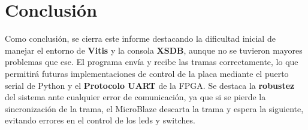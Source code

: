 \documentclass[12pt, a4paper]{article}
\begin{document}
\newpage

\section{Conclusión}
    Como conclusión, se cierra este informe destacando la dificultad inicial de manejar el entorno de \textbf{Vitis} y la consola \textbf{XSDB}, aunque no se tuvieron mayores problemas que ese.
    El programa envía y recibe las tramas correctamente, lo que permitirá futuras implementaciones de control de la placa mediante el puerto serial de Python y el \textbf{Protocolo UART} de la 
    FPGA. Se destaca la \textbf{robustez} del sistema ante cualquier error de comunicación, ya que si se pierde la sincronización de la trama, el MicroBlaze descarta la trama y espera la siguiente,
    evitando errores en el control de los leds y switches.
\end{document}
